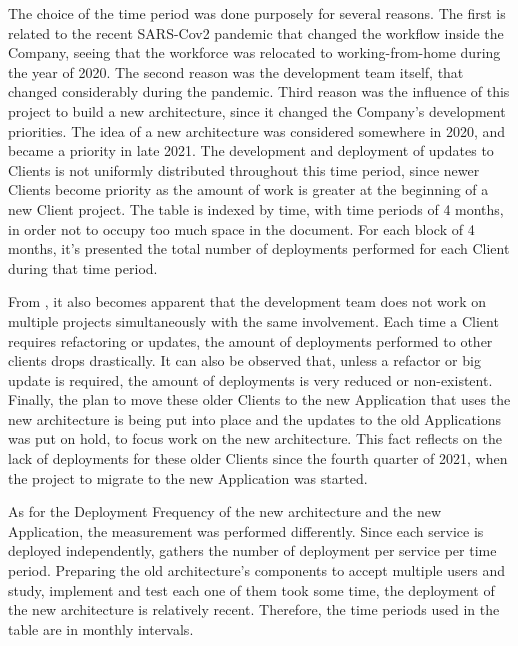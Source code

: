 

The choice of the time period was done purposely for several reasons. The first is related to the recent SARS-Cov2 pandemic that changed the workflow inside the Company, seeing that the workforce was relocated to working-from-home during the year of 2020. The second reason was the development team itself, that changed considerably during the pandemic. Third reason was the influence of this project to build a new architecture, since it changed the Company's development priorities. The idea of a new architecture was considered somewhere in 2020, and became a priority in late 2021. The development and deployment of updates to Clients is not uniformly distributed throughout this time period, since newer Clients become priority as the amount of work is greater at the beginning of a new Client project. The table is indexed by time, with time periods of 4 months, in order not to occupy too much space in the document. For each block of 4 months, it's presented the total number of deployments performed for each Client during that time period. 

From , it also becomes apparent that the development team does not work on multiple projects simultaneously with the same involvement. Each time a Client requires refactoring or updates, the amount of deployments performed to other clients drops drastically. It can also be observed that, unless a refactor or big update is required, the amount of deployments is very reduced or non-existent.
Finally, the plan to move these older Clients to the new Application that uses the new architecture is being put into place and the updates to the old Applications was put on hold, to focus work on the new architecture. This fact reflects on the lack of deployments for these older Clients since the fourth quarter of 2021, when the project to migrate to the new Application was started.



As for the Deployment Frequency of the new architecture and the new Application, the measurement was performed differently. Since each service is deployed independently,  gathers the number of deployment per service per time period. Preparing the old architecture's components to accept multiple users and study, implement and test each one of them took some time, the deployment of the new architecture is relatively recent. Therefore, the time periods used in the table are in monthly intervals.

